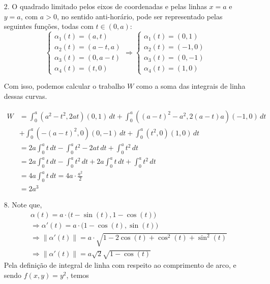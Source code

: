 \documentclass[../main.tex]{subfiles}
\begin{document}
	\begin{solucao}
		\begin{enumerate}
			\item[2.] O quadrado limitado pelos eixos de coordenadas e pelas linhas $x=a$ e $y=a$, com $a>0$, no sentido anti-horário, pode ser representado pelas seguintes funções, todas com $t\in(0,a)$:
			\[
			\begin{cases} \alpha_1(t)=(a,t) \\ \alpha_2(t)=(a-t,a)\\ \alpha_3(t)=(0,a-t)\\\alpha_4(t)=(t,0) \end{cases} \Rightarrow \begin{cases} \alpha_1(t)=(0,1) \\ \alpha_2(t)=(-1,0)\\ \alpha_3(t)=(0,-1)\\\alpha_4(t)=(1,0) \end{cases}
			\]
			
			Com isso, podemos calcular o trabalho $W$ como a soma das integrais de linha dessas curvas.
			
			\begin{align*}
				W
				&= \int_0^a (a^2-t^2,2at)(0,1)\, dt + \int_0^a ((a-t)^2-a^2, 2(a-t)a)(-1,0)\, dt \\
				&+ \int_0^a (-(a-t)^2,0)(0,-1)\, dt + \int_0^a (t^2,0)(1,0)\, dt \\
				&= 2a\int_0^a t\, dt - \int_0^a t^2-2at\, dt +\int_0^a t^2\, dt \\
				&= 2a\int_0^a t\, dt - \int_0^a t^2\, dt +2a\int_0^a t\, dt +\int_0^a t^2\, dt \\
				&= 4a \int_0^a t\, dt = 4a\cdot \frac{a^2}{2}\\
				&= 2a^3
			\end{align*}
			
			\item[8.] Note que,
			\begin{align*}
			&\alpha(t)=a\cdot \big(t-\sin(t),1-\cos(t)\big)\\
			&\Rightarrow \alpha'(t)=a\cdot \big(1-\cos(t),\sin(t)\big)\\
			&\Rightarrow \|\alpha'(t)\|=a\cdot \sqrt{1-2\cos(t)+\cos^2(t)+\sin^2(t)}\\
			&\Rightarrow \|\alpha'(t)\|=a\sqrt{2}\sqrt{1-\cos(t)}
			\end{align*}
			Pela definição de integral de linha com respeito ao comprimento de arco, e sendo $f(x,y)=y^2$, temos
			

\end{enumerate}
\end{solucao}
\end{document}
